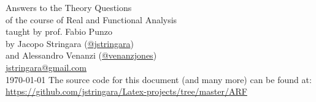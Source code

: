 \begin{titlepage}
    \begin{center}
        \vspace*{\fill}
        \Huge
        Answers to the Theory Questions\\
        \vspace{0.5em}
        \Large
        of the course of Real and Functional Analysis\\
        taught by prof. Fabio Punzo \\
        \vspace{0.5em}
        by Jacopo Stringara (\href{https://github.com/jstringara}{@jstringara})\\
        and Alessandro Venanzi (\href{https://github.com/venanzjones}{@venanzjones})\\
        \vspace{0.5em}
        \href{mailto:jstringara@gmail.com}{jstringara@gmail.com} \\
        \vspace{0.5em}
        \today
        \vfill
        The source code for this document (and many more) can be found at:\\
        \href{https://github.com/jstringara/Latex-projects/tree/master/ARF}{https://github.com/jstringara/Latex-projects/tree/master/ARF}
    \end{center}
\end{titlepage}
